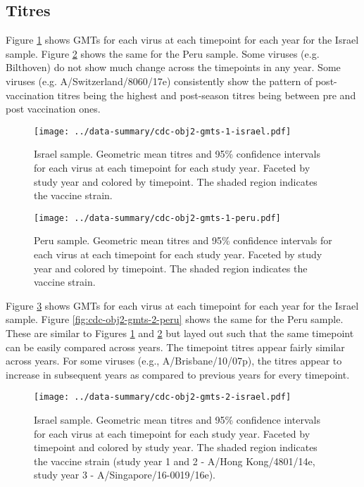 \documentclass[12pt]{article}
\begin{document}


\subsection{Titres}

Figure \ref{fig:cdc-obj2-gmts-1-israel} shows GMTs for each virus at each timepoint for each year for the Israel sample. Figure \ref{fig:cdc-obj2-gmts-1-peru} shows the same for the Peru sample.
Some viruses (e.g. Bilthoven) do not show much change across the timepoints in
any year. Some viruses (e.g. A/Switzerland/8060/17e) consistently show the pattern of post-vaccination titres being the highest and post-season titres being between pre and post vaccination ones.

\begin{figure}
	\texttt{[image: ../data-summary/cdc-obj2-gmts-1-israel.pdf]}
	\caption{Israel sample. Geometric mean titres and 95\% confidence intervals for each virus at each timepoint for each study year. Faceted by study year and colored by timepoint. The shaded region indicates the vaccine strain.}
	\label{fig:cdc-obj2-gmts-1-israel}
\end{figure}

\begin{figure}
	\texttt{[image: ../data-summary/cdc-obj2-gmts-1-peru.pdf]}
	\caption{Peru sample. Geometric mean titres and 95\% confidence intervals for each virus at each timepoint for each study year. Faceted by study year and colored by timepoint. The shaded region indicates the vaccine strain.}
	\label{fig:cdc-obj2-gmts-1-peru}
\end{figure}

Figure \ref{fig:cdc-obj2-gmts-2-israel} shows GMTs for each virus at each timepoint for each year for the Israel sample. Figure \ref{fig:cdc-obj2-gmts-2-peru} shows the same for the Peru sample. These are similar to Figures \ref{fig:cdc-obj2-gmts-1-israel} and \ref{fig:cdc-obj2-gmts-1-peru} but layed out such that the same timepoint can be easily compared across years. The timepoint titres appear fairly similar across years. For some viruses (e.g., A/Brisbane/10/07p), the titres appear to increase in subsequent years as compared to previous years for every timepoint.

\begin{figure}
	\texttt{[image: ../data-summary/cdc-obj2-gmts-2-israel.pdf]}
	\caption{Israel sample. Geometric mean titres and 95\% confidence intervals for each virus at each timepoint for each study year. Faceted by timepoint and colored by study year. The shaded region indicates the vaccine strain (study year 1 and 2 - A/Hong Kong/4801/14e, study year 3 - A/Singapore/16-0019/16e).}
	\label{fig:cdc-obj2-gmts-2-israel}
\end{figure}
\end{document}
